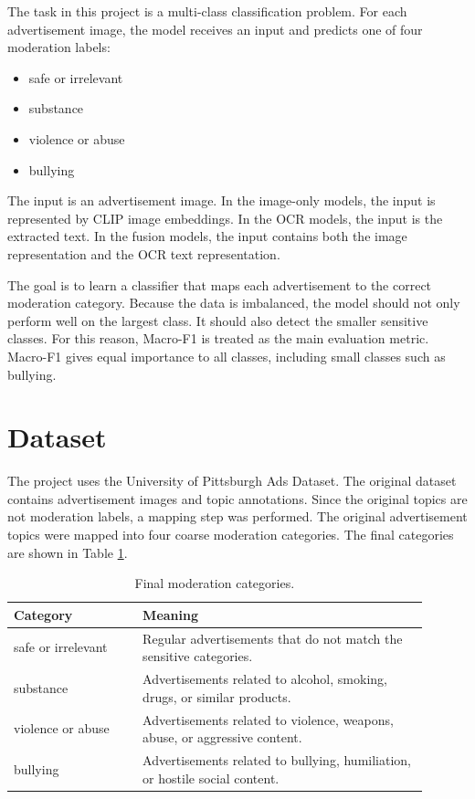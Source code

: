 \documentclass[12pt]{article}
\begin{document}
The task in this project is a multi-class classification problem. For each advertisement image, the model receives an input and predicts one of four moderation labels:
\begin{itemize}
    \item safe or irrelevant
    \item substance
    \item violence or abuse
    \item bullying
\end{itemize}

The input is an advertisement image. In the image-only models, the input is represented by CLIP image embeddings. In the OCR models, the input is the extracted text. In the fusion models, the input contains both the image representation and the OCR text representation.

The goal is to learn a classifier that maps each advertisement to the correct moderation category. Because the data is imbalanced, the model should not only perform well on the largest class. It should also detect the smaller sensitive classes. For this reason, Macro-F1 is treated as the main evaluation metric. Macro-F1 gives equal importance to all classes, including small classes such as bullying.

\section{Dataset}

The project uses the University of Pittsburgh Ads Dataset. The original dataset contains advertisement images and topic annotations. Since the original topics are not moderation labels, a mapping step was performed. The original advertisement topics were mapped into four coarse moderation categories. The final categories are shown in Table \ref{tab:categories}.

\begin{table}[H]
\centering
\begin{tabular}{p{0.28\linewidth} p{0.62\linewidth}}
\toprule
\textbf{Category} & \textbf{Meaning} \\
\midrule
safe or irrelevant & Regular advertisements that do not match the sensitive categories. \\
substance & Advertisements related to alcohol, smoking, drugs, or similar products. \\
violence or abuse & Advertisements related to violence, weapons, abuse, or aggressive content. \\
bullying & Advertisements related to bullying, humiliation, or hostile social content. \\
\bottomrule
\end{tabular}
\caption{Final moderation categories.}
\label{tab:categories}
\end{table}
\end{document}
